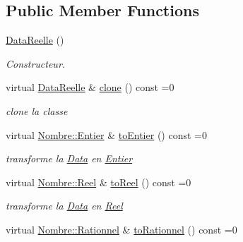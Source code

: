 \subsection*{Public Member Functions}
\begin{DoxyCompactItemize}
\item 
\hyperlink{classNombre_1_1DataReelle_a3360b818a88c03f35499c1cd8cdb614b}{DataReelle} ()
\begin{DoxyCompactList}\small\item\em Constructeur. \item\end{DoxyCompactList}\item 
\hypertarget{classNombre_1_1DataReelle_aa267b82217eae17427ef10be250dfac7}{
virtual \hyperlink{classNombre_1_1DataReelle}{DataReelle} \& \hyperlink{classNombre_1_1DataReelle_aa267b82217eae17427ef10be250dfac7}{clone} () const =0}
\label{classNombre_1_1DataReelle_aa267b82217eae17427ef10be250dfac7}

\begin{DoxyCompactList}\small\item\em clone la classe \item\end{DoxyCompactList}\item 
\hypertarget{classNombre_1_1DataReelle_aef66518fe7007b3673028ffce6d8f1c8}{
virtual \hyperlink{classNombre_1_1Entier}{Nombre::Entier} \& \hyperlink{classNombre_1_1DataReelle_aef66518fe7007b3673028ffce6d8f1c8}{toEntier} () const =0}
\label{classNombre_1_1DataReelle_aef66518fe7007b3673028ffce6d8f1c8}

\begin{DoxyCompactList}\small\item\em transforme la \hyperlink{classNombre_1_1Data}{Data} en \hyperlink{classNombre_1_1Entier}{Entier} \item\end{DoxyCompactList}\item 
\hypertarget{classNombre_1_1DataReelle_ae84e9c4bb3e792eab7ce487778089529}{
virtual \hyperlink{classNombre_1_1Reel}{Nombre::Reel} \& \hyperlink{classNombre_1_1DataReelle_ae84e9c4bb3e792eab7ce487778089529}{toReel} () const =0}
\label{classNombre_1_1DataReelle_ae84e9c4bb3e792eab7ce487778089529}

\begin{DoxyCompactList}\small\item\em transforme la \hyperlink{classNombre_1_1Data}{Data} en \hyperlink{classNombre_1_1Reel}{Reel} \item\end{DoxyCompactList}\item 
\hypertarget{classNombre_1_1DataReelle_af047f3ec5bf59e3183b185f96af134a4}{
virtual \hyperlink{classNombre_1_1Rationnel}{Nombre::Rationnel} \& \hyperlink{classNombre_1_1DataReelle_af047f3ec5bf59e3183b185f96af134a4}{toRationnel} () const =0}
\label{classNombre_1_1DataReelle_af047f3ec5bf59e3183b185f96af134a4}


\end{DoxyCompactItemize}
